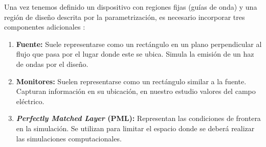 Una vez tenemos definido un dispositivo con regiones fijas (guías de onda) y una
región de diseño descrita por la parametrización, es necesario incorporar
tres componentes adicionales \citep{Oskooi2010, Su2020}:

\begin{enumerate}

  \item \textbf{Fuente:} Suele representarse como un rectángulo en un plano perpendicular al flujo
    que pasa por el lugar donde este se ubica. Simula la emisión de un haz de ondas por el diseño.

  \item \textbf{Monitores:} Suelen representarse como un rectángulo similar a la fuente.
    Capturan información en su ubicación, en nuestro estudio valores del campo eléctrico.

  \item \textbf{\emph{Perfectly Matched Layer} (PML):} Representan las condiciones de frontera en la simulación. 
    Se utilizan para limitar el espacio donde se deberá realizar las simulaciones computacionales.

\end{enumerate}


